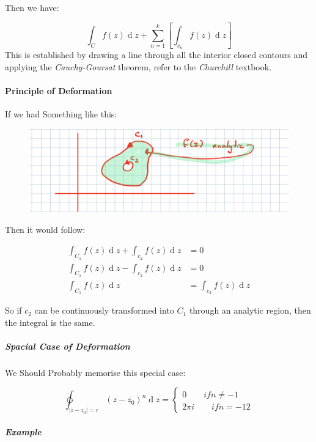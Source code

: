 \documentclass[class=article, crop=false]{standalone}
\begin{document}
Then we have:

\[
\int^{}_{C} f\left( z \right)   \operatorname{d}z + \sum^{k}_{n= 1} \left[ \int^{}_{c_n} f\left( z \right)   \operatorname{d}z  \right] 
\]
This is established by drawing a line through all the interior closed contours and applying the \textit{Cauchy-Goursat} theorem, refer to the \textit{Churchill} textbook.

\paragraph{Principle of Deformation}
If we had Something like this:

\begin{figure}[h!]
	\centering
	\includegraphics[width=0.7\linewidth]{./media/CompexIntegrals/s2.png}
	\caption{}
	\label{fig:s2}
\end{figure}


Then it would follow:

\begin{align*}
  \int^{}_{C_1} f\left( z \right)   \operatorname{d}z + \int^{}_{c_2} f\left( z \right)   \operatorname{d}z &= 0\\  
  \int^{}_{C_1} f\left( z \right)   \operatorname{d}z - \int^{}_{c_2} f\left( z \right)   \operatorname{d}z &= 0\\
  \int^{}_{C_1} f\left( z \right)   \operatorname{d}z &= \int^{}_{c_2} f\left( z \right)   \operatorname{d}z  
\end{align*}

So if $c_2$ can be continuously transformed into $C_1$ through an analytic region, then the integral is the same.

\subparagraph{Spacial Case of Deformation}
We Should Probably memorise this special case:

\[
\ointctrclockwise^{}_{    \left| z - z_0 \right| = r} \left( z- z_0 \right) ^n  \operatorname{d}z = 
\begin{cases}
  0 \qquad if n \neq - 1\\
  2\pi i \qquad if n = - 12
\end{cases}
\]

\subparagraph{Example}
\end{document}
